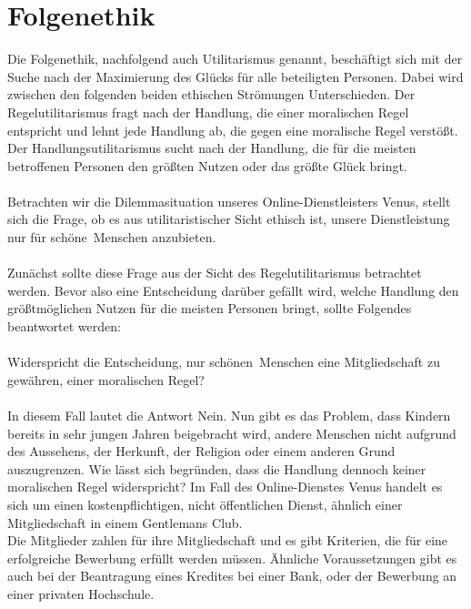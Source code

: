 \author{Autor: Leonie Schiburr}
\section{Folgenethik}

Die Folgenethik, nachfolgend auch Utilitarismus genannt, beschäftigt sich mit der Suche nach der Maximierung des Glücks für
alle beteiligten Personen. Dabei wird zwischen den folgenden beiden ethischen Strömungen Unterschieden. Der Regelutilitarismus fragt nach der Handlung, die einer moralischen Regel entspricht und lehnt jede Handlung ab, die gegen eine moralische Regel verstößt. Der Handlungsutilitarismus sucht nach der Handlung, die für die meisten betroffenen Personen den größten Nutzen oder das größte Glück bringt.\\
\\
Betrachten wir die Dilemmasituation unseres Online-Dienstleisters Venus, stellt sich die Frage, ob es aus utilitaristischer Sicht ethisch ist,
unsere Dienstleistung nur für \glqq schöne\grqq~Menschen anzubieten.\\
\\
Zunächst sollte diese Frage aus der Sicht des Regelutilitarismus betrachtet werden. Bevor also eine Entscheidung darüber gefällt wird, welche Handlung den größtmöglichen Nutzen für die meisten Personen bringt, sollte Folgendes beantwortet werden:\\
\\
Widerspricht die Entscheidung, nur \glqq schönen\grqq~Menschen eine Mitgliedschaft zu gewähren, einer moralischen Regel?\\
\\
In diesem Fall lautet die Antwort \glqq Nein\grqq. Nun gibt es das Problem, dass Kindern bereits in sehr jungen Jahren beigebracht wird, andere Menschen nicht aufgrund des Aussehens, der Herkunft, der Religion oder einem anderen Grund auszugrenzen. Wie lässt sich begründen, dass die Handlung dennoch keiner moralischen Regel widerspricht? Im Fall des Online-Dienstes Venus handelt es sich um einen kostenpflichtigen, nicht öffentlichen Dienst, ähnlich einer Mitgliedschaft in einem \glqq Gentlemans Club\grqq. \\
Die Mitglieder zahlen für ihre Mitgliedschaft und es gibt Kriterien, die für eine erfolgreiche Bewerbung erfüllt werden müssen. Ähnliche Voraussetzungen gibt es auch bei der Beantragung eines Kredites bei einer Bank, oder der Bewerbung an einer privaten Hochschule.\\ 
\\
